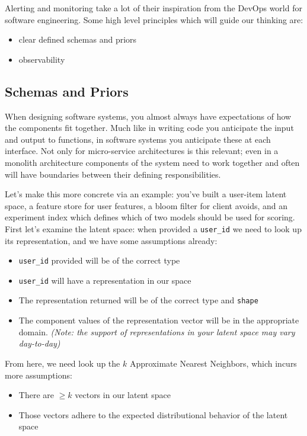 Alerting and monitoring take a lot of their inspiration from the DevOps world for software engineering. Some high level principles which will guide our thinking are:

\begin{itemize}
\item clear defined schemas and priors
\item observability
\end{itemize}

\subsection{Schemas and Priors}

When designing software systems, you almost always have expectations of how the components fit together. Much like in writing code you anticipate the input and output to functions, in software systems you anticipate these at each interface. Not only for micro-service architectures is this relevant; even in a monolith architecture components of the system need to work together and often will have boundaries between their defining responsibilities. 

Let's make this more concrete via an example: you've built a user-item latent space, a feature store for user features, a bloom filter for client avoids, and an experiment index which defines which of two models should be used for scoring. First let's examine the latent space: when provided a \lstinline{user_id} we need to look up its representation, and we have some assumptions already:

\begin{itemize}
\item \lstinline{user_id} provided will be of the correct type
\item \lstinline{user_id} will have a representation in our space
\item The representation returned will be of the correct type and \lstinline{shape}
\item The component values of the representation vector will be in the appropriate domain. \emph{(Note: the support of representations in your latent space may vary day-to-day)}
\end{itemize}

From here, we need look up the $k$ Approximate Nearest Neighbors, which incurs more assumptions:

\begin{itemize}
\item There are $\geq k$ vectors in our latent space
\item Those vectors adhere to the expected distributional behavior of the latent space
\end{itemize}

